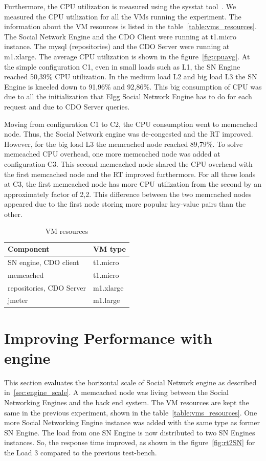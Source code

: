 Furthermore, the CPU utilization is measured using the sysstat tool~\cite{sysstat_url}. We measured the CPU utilization for all the VMs running the experiment. The information about the VM resources is listed in the table~\ref{table:vms_resources}. The Social Network Engine and the CDO Client were running at t1.micro instance. The mysql (repositories) and the CDO Server were running at m1.xlarge. The average CPU utilization is shown in the figure~\ref{fig:cpuavg}. At the simple configuration C1, even in small loads such as L1, the SN Engine reached 50,39\% CPU utilization. In the medium load L2 and big load L3 the SN Engine is kneeled down to 91,96\% and 92,86\%. This big consumption of CPU was due to all the initialization that Elgg Social Network Engine has to do for each request and due to CDO Server queries.

Moving from configuration C1 to C2, the CPU consumption went to memcached node. Thus, the Social Network engine was de-congested and the RT improved. However, for the big load L3 the memcached node reached 89,79\%. To solve memcached CPU overhead, one more memcached node was added at configuration C3. This second memcached node shared the CPU overhead with the first memcached node and the RT improved furthermore. For all three loads at C3, the first memcached node has more CPU utilization from the second by an approximately factor of 2,2. This difference between the two memcached nodes appeared due to the first node storing more popular key-value pairs than the other.

\begin{table}[]
\label{table:vms_resources}
\centering
\caption{VM resources}
\label{my-label}
\begin{tabular}{|l|l|}
\hline
 Component &  VM type \\ \hline
 SN engine, CDO client &  t1.micro \\ \hline
 memcached &  t1.micro \\ \hline
 repositories, CDO Server &  m1.xlarge \\ \hline
 jmeter &  m1.large \\ \hline
\end{tabular}
\end{table}

\section{Improving Performance with engine}
This section evaluates the horizontal scale of Social Network engine as described in~\ref{sec:engine_scale}. A memcached node was living between the Social Networking Engines and the back end system. The VM resources are kept the same in the previous experiment, shown in the table~\ref{table:vms_resources}. One more Social Networking Engine instance was added with the same type as former SN Engine. The load from one SN Engine is now distributed to two SN Engines instances. So, the response time improved, as shown in the figure~\ref{fig:rt2SN} for the Load 3 compared to the previous test-bench. 

